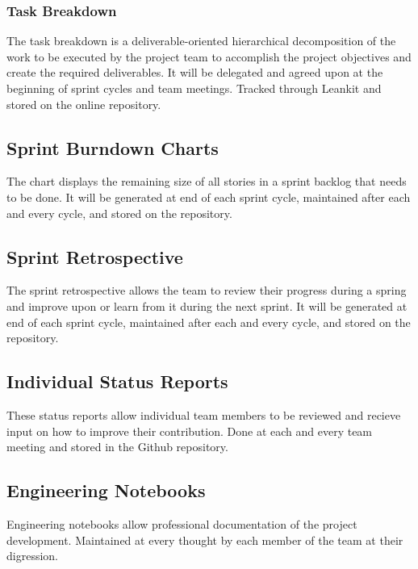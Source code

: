 \subsubsection{Task Breakdown}
The task breakdown is a deliverable-oriented hierarchical decomposition of the work to be executed by the project team to accomplish the project objectives and create the required deliverables. It will be delegated and agreed upon at the beginning of sprint cycles and team meetings. Tracked through Leankit and stored on the online repository.

\subsection{Sprint Burndown Charts}
The chart displays the remaining size of all stories in a sprint backlog that needs to be done. It will be generated at end of each sprint cycle, maintained after each and every cycle, and stored on the repository.


\subsection{Sprint Retrospective}
The sprint retrospective allows the team to review their progress during a spring and improve upon or learn from it during the next sprint. It will be generated at end of each sprint cycle, maintained after each and every cycle, and stored on the repository.

\subsection{Individual Status Reports}
These status reports allow individual team members to be reviewed and recieve input on how to improve their contribution. Done at each and every team meeting and stored in the Github repository.

\subsection{Engineering Notebooks}
Engineering notebooks allow professional documentation of the project development. Maintained at every thought by each member of the team at their digression.

